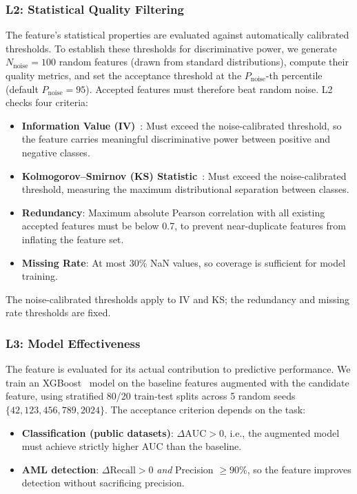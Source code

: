 \subsubsection{L2: Statistical Quality Filtering}
The feature's statistical properties are evaluated against automatically calibrated thresholds. To establish these thresholds for discriminative power, we generate $N_{\text{noise}} = 100$ random features (drawn from standard distributions), compute their quality metrics, and set the acceptance threshold at the $P_{\text{noise}}$-th percentile (default $P_{\text{noise}} = 95$). Accepted features must therefore beat random noise. L2 checks four criteria:
\begin{itemize}
    \item \textbf{Information Value (IV)}~\cite{chen2018aml}: Must exceed the noise-calibrated threshold, so the feature carries meaningful discriminative power between positive and negative classes.
    \item \textbf{Kolmogorov--Smirnov (KS) Statistic}~\cite{nargesian2017learning}: Must exceed the noise-calibrated threshold, measuring the maximum distributional separation between classes.
    \item \textbf{Redundancy}: Maximum absolute Pearson correlation with all existing accepted features must be below 0.7, to prevent near-duplicate features from inflating the feature set.
    \item \textbf{Missing Rate}: At most 30\% NaN values, so coverage is sufficient for model training.
\end{itemize}
The noise-calibrated thresholds apply to IV and KS; the redundancy and missing rate thresholds are fixed.

\subsubsection{L3: Model Effectiveness}
The feature is evaluated for its actual contribution to predictive performance. We train an XGBoost~\cite{chen2016xgboost} model on the baseline features augmented with the candidate feature, using stratified 80/20 train-test splits across 5 random seeds $\{42, 123, 456, 789, 2024\}$. The acceptance criterion depends on the task:
\begin{itemize}
    \item \textbf{Classification (public datasets)}: $\Delta\text{AUC} > 0$, i.e., the augmented model must achieve strictly higher AUC than the baseline.
    \item \textbf{AML detection}: $\Delta\text{Recall} > 0$ \emph{and} Precision $\geq 90\%$, so the feature improves detection without sacrificing precision.
\end{itemize}

